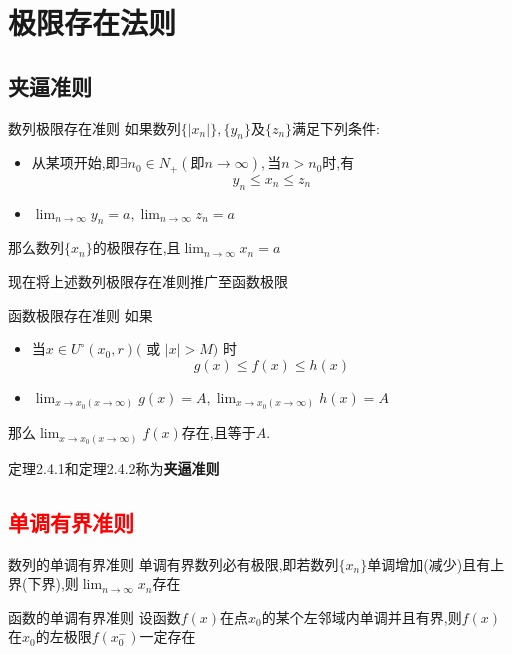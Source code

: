 \documentclass[12pt, a4paper, oneside, UTF8]{ctexbook}  %
\begin{document}
\begin{sloppypar}
    \section{极限存在法则}

    \subsection{夹逼准则}
    \begin{them}{数列极限存在准则}{}
        如果数列$\{|x_n|\},\{y_n\}$及$\{z_n\}$满足下列条件:
        \begin{itemize}
            \item 从某项开始,即$\exists n_0 \in N_+(\text{即}n \to \infty),$当$n>n_0$时,有
                  $$
                      y_n \leqslant x_n \leqslant z_n
                  $$
            \item $\lim_{n\to\infty}y_{n}=a,\operatorname*{lim}_{n\to\infty}z_{n}=a$
        \end{itemize}
        那么数列$\{ x_n \}$的极限存在,且$\lim_{n\to\infty}x_{n}=a$
    \end{them}
    现在将上述数列极限存在准则推广至函数极限
    \begin{them}{函数极限存在准则}{}
        如果
        \begin{itemize}
            \item 当$x\in U^{\circ}(x_{0},r)($ 或 $|x|>M)$ 时
                  $$
                      g(x)\leqslant f(x) \leqslant h(x)
                  $$
            \item $\lim_{x\to x_0(x\to\infty)}g(x)=A,\lim_{x\to x_0(x\to\infty)}h(x)=A$
        \end{itemize}
        那么$\lim_{x\to x_0(x\to\infty)}f(x)$存在,且等于$A$.
    \end{them}
    定理2.4.1和定理2.4.2称为\textbf{夹逼准则}
    \subsection{\textcolor{red}{单调有界准则}}
    \begin{them}{数列的单调有界准则}{}
        单调有界数列必有极限,即若数列$\{x_n\}$单调增加(减少)且有上界(下界),则$\lim_{n \to \infty} x_n$存在
    \end{them}

    \begin{them}{函数的单调有界准则}{}
        设函数$f(x)$在点$x_0$的某个左邻域内单调并且有界,则$f(x)$在$x_0$的左极限$f(x_0^-)$一定存在
    \end{them}

\end{sloppypar}
\end{document}

